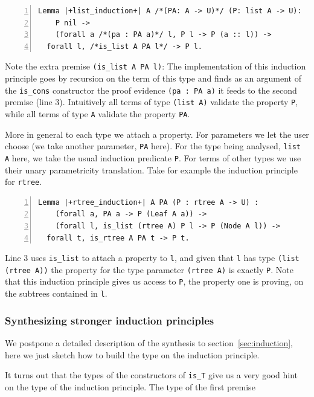 \documentclass[a4paper,UKenglish,cleveref, autoref]{lipics-v2019}
\begin{document}
\begin{lstlisting}[numbers=left]
Lemma |+list_induction+| A /*(PA: A -> U)*/ (P: list A -> U):
    P nil ->
    (forall a /*(pa : PA a)*/ l, P l -> P (a :: l)) ->
  forall l, /*is_list A PA l*/ -> P l.
\end{lstlisting}

\noindent
Note the extra premise \lstinline+(is_list A PA l)+: The
implementation of this induction principle
goes by recursion on the term of this type and finds
as an argument of the \lstinline+is_cons+ constructor
the proof evidence \lstinline+(pa : PA a)+ it feeds to the second premise
(line 3). Intuitively all terms of type \lstinline+(list A)+
validate the property \lstinline+P+, while all terms of type
\lstinline+A+ validate the property \lstinline+PA+.

More in general to each type we attach a property. For parameters we
let the user choose (we take another parameter, \lstinline+PA+ here).
For the type being analysed, \lstinline+list A+ here, we take the
usual induction predicate \lstinline+P+.
For terms of other types we use their unary parametricity translation.
Take for example the induction principle for \lstinline+rtree+.

\begin{lstlisting}[numbers=left]
Lemma |+rtree_induction+| A PA (P : rtree A -> U) :
    (forall a, PA a -> P (Leaf A a)) ->
    (forall l, is_list (rtree A) P l -> P (Node A l)) ->
  forall t, is_rtree A PA t -> P t.
\end{lstlisting}

\noindent
Line 3 uses \lstinline+is_list+ to attach a property to \lstinline+l+,
and given that \lstinline+l+ has type \lstinline+(list (rtree A))+
the property for the type parameter \lstinline+(rtree A)+ is
exactly \lstinline+P+.
Note that this induction principle gives us access to \lstinline+P+, the
property one is proving, on the subtrees contained in \lstinline+l+.

\subsubsection{Synthesizing stronger induction principles} %

We postpone a detailed description of the synthesis to
section~\ref{sec:induction}, here we just sketch how to
build the type on the induction principle.

It turns out that the types of the constructors of
\lstinline+is_T+ give us a very good hint on the type
of the induction principle.
The type of the first premise
\end{document}
